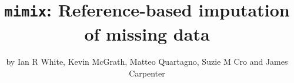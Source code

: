 




\newcommand {\varb}   [1] {{\rm var}\left(#1\right)}
\newcommand {\cov}    [2] {{\rm cov}\left(#1,#2\right)}
\newcommand {\cind}      {\mbox{$\perp\hspace{-0.5em}\perp$}}
\newcommand {\logit}  [1] {{\rm logit}\ #1}
\newcommand {\twovec}[2] {\left( \begin{array}{c} #1 \\ #2 \end{array} \right)}
\newcommand {\N} [2] {N\left(#1,#2\right)}

\newcommand {\pret}{{\le{t}}}
\newcommand {\postt}{{>t}}
\newcommand{\bX}{\boldsymbol{X}}
\newcommand{\bY}{\boldsymbol{Y}}
\newcommand {\tmax}{T} %
\newcommand{\KK}{k_1}



\title{\texttt{mimix}: Reference-based imputation of missing data}
\author{by Ian R White, Kevin McGrath, Matteo Quartagno, Suzie M Cro and James Carpenter}

